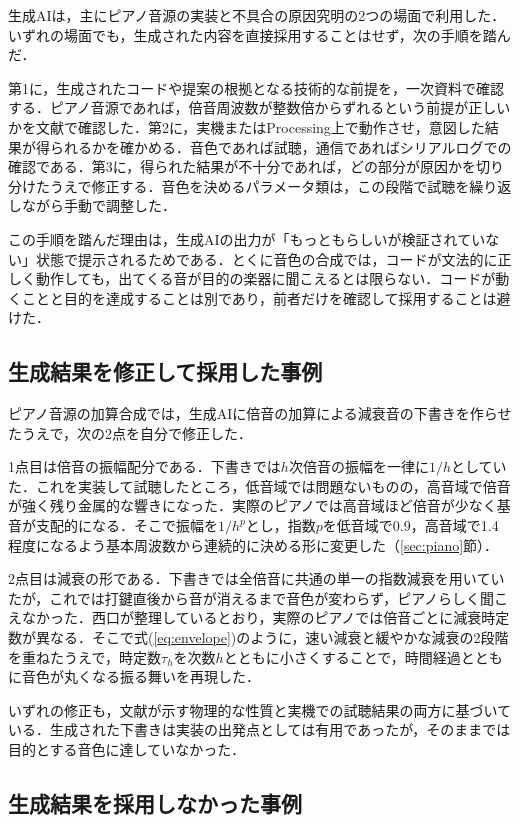\documentclass[uplatex,dvipdfmx]{jlreq}
\begin{document}
生成AIは，主にピアノ音源の実装と不具合の原因究明の2つの場面で利用した．いずれの場面でも，生成された内容を直接採用することはせず，次の手順を踏んだ．

第1に，生成されたコードや提案の根拠となる技術的な前提を，一次資料で確認する．ピアノ音源であれば，倍音周波数が整数倍からずれるという前提が正しいかを文献\cite{fletcher,nishiguchi}で確認した．第2に，実機またはProcessing上で動作させ，意図した結果が得られるかを確かめる．音色であれば試聴，通信であればシリアルログでの確認である．第3に，得られた結果が不十分であれば，どの部分が原因かを切り分けたうえで修正する．音色を決めるパラメータ類は，この段階で試聴を繰り返しながら手動で調整した．

この手順を踏んだ理由は，生成AIの出力が「もっともらしいが検証されていない」状態で提示されるためである．とくに音色の合成では，コードが文法的に正しく動作しても，出てくる音が目的の楽器に聞こえるとは限らない．コードが動くことと目的を達成することは別であり，前者だけを確認して採用することは避けた．

\subsection{生成結果を修正して採用した事例}

ピアノ音源の加算合成では，生成AIに倍音の加算による減衰音の下書きを作らせたうえで，次の2点を自分で修正した．

1点目は倍音の振幅配分である．下書きでは$h$次倍音の振幅を一律に$1/h$としていた．これを実装して試聴したところ，低音域では問題ないものの，高音域で倍音が強く残り金属的な響きになった．実際のピアノでは高音域ほど倍音が少なく基音が支配的になる．そこで振幅を$1/h^p$とし，指数$p$を低音域で0.9，高音域で1.4程度になるよう基本周波数から連続的に決める形に変更した（\ref{sec:piano}節）．

2点目は減衰の形である．下書きでは全倍音に共通の単一の指数減衰を用いていたが，これでは打鍵直後から音が消えるまで音色が変わらず，ピアノらしく聞こえなかった．西口が整理しているとおり，実際のピアノでは倍音ごとに減衰時定数が異なる\cite{nishiguchi}．そこで式(\ref{eq:envelope})のように，速い減衰と緩やかな減衰の2段階を重ねたうえで，時定数$\tau_h$を次数$h$とともに小さくすることで，時間経過とともに音色が丸くなる振る舞いを再現した．

いずれの修正も，文献が示す物理的な性質と実機での試聴結果の両方に基づいている．生成された下書きは実装の出発点としては有用であったが，そのままでは目的とする音色に達していなかった．

\subsection{生成結果を採用しなかった事例}
\end{document}
